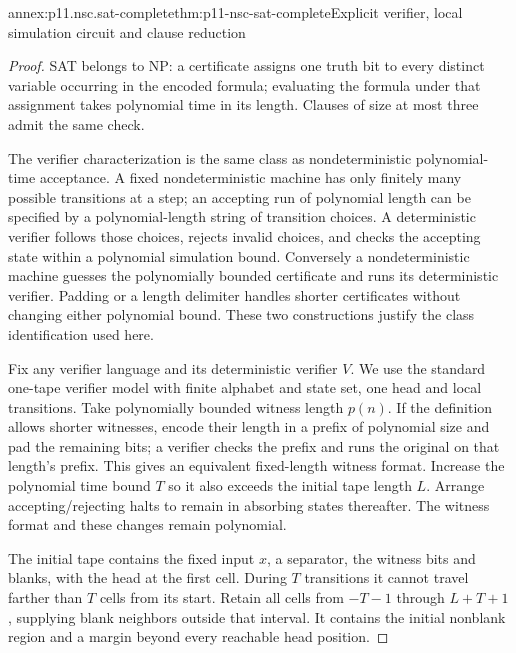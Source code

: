 \begin{annexitem}{annex:p11.nsc.sat-complete}{thm:p11-nsc-sat-complete}{Explicit verifier, local simulation circuit and clause reduction}
\begin{proof}
SAT belongs to NP: a certificate assigns one truth bit to every distinct
variable occurring in the encoded formula; evaluating the formula under
that assignment takes polynomial time in its length. Clauses of size at
most three admit the same check.

The verifier characterization is the same class as nondeterministic
polynomial-time acceptance. A fixed nondeterministic machine has only
finitely many possible transitions at a step; an accepting run of polynomial
length can be specified by a polynomial-length string of transition choices.
A deterministic verifier follows those choices, rejects invalid choices,
and checks the accepting state within a polynomial simulation bound.
Conversely a nondeterministic machine guesses the polynomially bounded
certificate and runs its deterministic verifier. Padding or a length
delimiter handles shorter certificates without changing either polynomial
bound. These two constructions justify the class identification used here.

Fix any verifier language and its deterministic verifier \(V\). We use
the standard one-tape verifier model with finite alphabet and state set,
one head and local transitions. Take polynomially bounded witness length
\(p(n)\). If the definition allows shorter witnesses, encode their
length in a prefix of polynomial size and pad the remaining bits; a verifier
checks the prefix and runs the original on that length's prefix. This
gives an equivalent fixed-length witness format. Increase the polynomial
time bound \(T\) so it also exceeds the initial tape length \(L\).
Arrange accepting/rejecting halts to remain in absorbing states thereafter.
The witness format and these changes remain polynomial.

The initial tape contains the fixed input \(x\), a separator, the witness
bits and blanks, with the head at the first cell. During \(T\) transitions
it cannot travel farther than \(T\) cells from its start. Retain all cells
from \(-T-1\) through \(L+T+1\), supplying blank neighbors outside
that interval. It contains the initial nonblank region and a margin beyond
every reachable head position.


\end{proof}
\end{annexitem}
